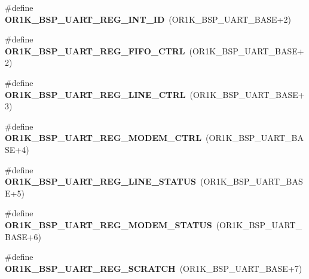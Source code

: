 \begin{DoxyCompactItemize}
\item 
\mbox{\label{group__generic__or1k__reg_gacf46f93e3c2435365743911ff3aba606}} 
\#define {\bfseries O\+R1\+K\+\_\+\+B\+S\+P\+\_\+\+U\+A\+R\+T\+\_\+\+R\+E\+G\+\_\+\+I\+N\+T\+\_\+\+ID}~(O\+R1\+K\+\_\+\+B\+S\+P\+\_\+\+U\+A\+R\+T\+\_\+\+B\+A\+SE+2)
\item 
\mbox{\label{group__generic__or1k__reg_ga3008c4067916d1ef50eec2a9dee160d1}} 
\#define {\bfseries O\+R1\+K\+\_\+\+B\+S\+P\+\_\+\+U\+A\+R\+T\+\_\+\+R\+E\+G\+\_\+\+F\+I\+F\+O\+\_\+\+C\+T\+RL}~(O\+R1\+K\+\_\+\+B\+S\+P\+\_\+\+U\+A\+R\+T\+\_\+\+B\+A\+SE+2)
\item 
\mbox{\label{group__generic__or1k__reg_ga7946b4bb4752f46aa2752c8ff9e10c15}} 
\#define {\bfseries O\+R1\+K\+\_\+\+B\+S\+P\+\_\+\+U\+A\+R\+T\+\_\+\+R\+E\+G\+\_\+\+L\+I\+N\+E\+\_\+\+C\+T\+RL}~(O\+R1\+K\+\_\+\+B\+S\+P\+\_\+\+U\+A\+R\+T\+\_\+\+B\+A\+SE+3)
\item 
\mbox{\label{group__generic__or1k__reg_gaa3cf96f25c33d667aa05353de13ebadb}} 
\#define {\bfseries O\+R1\+K\+\_\+\+B\+S\+P\+\_\+\+U\+A\+R\+T\+\_\+\+R\+E\+G\+\_\+\+M\+O\+D\+E\+M\+\_\+\+C\+T\+RL}~(O\+R1\+K\+\_\+\+B\+S\+P\+\_\+\+U\+A\+R\+T\+\_\+\+B\+A\+SE+4)
\item 
\mbox{\label{group__generic__or1k__reg_ga4661bde9d0f27736ab8c0035c0996e3e}} 
\#define {\bfseries O\+R1\+K\+\_\+\+B\+S\+P\+\_\+\+U\+A\+R\+T\+\_\+\+R\+E\+G\+\_\+\+L\+I\+N\+E\+\_\+\+S\+T\+A\+T\+US}~(O\+R1\+K\+\_\+\+B\+S\+P\+\_\+\+U\+A\+R\+T\+\_\+\+B\+A\+SE+5)
\item 
\mbox{\label{group__generic__or1k__reg_gac5f7eca6cf7bd77a6f2a25c1b241b3be}} 
\#define {\bfseries O\+R1\+K\+\_\+\+B\+S\+P\+\_\+\+U\+A\+R\+T\+\_\+\+R\+E\+G\+\_\+\+M\+O\+D\+E\+M\+\_\+\+S\+T\+A\+T\+US}~(O\+R1\+K\+\_\+\+B\+S\+P\+\_\+\+U\+A\+R\+T\+\_\+\+B\+A\+SE+6)
\item 
\mbox{\label{group__generic__or1k__reg_ga02fcc9690b966866f219101dff33fabd}} 
\#define {\bfseries O\+R1\+K\+\_\+\+B\+S\+P\+\_\+\+U\+A\+R\+T\+\_\+\+R\+E\+G\+\_\+\+S\+C\+R\+A\+T\+CH}~(O\+R1\+K\+\_\+\+B\+S\+P\+\_\+\+U\+A\+R\+T\+\_\+\+B\+A\+SE+7)

\end{DoxyCompactItemize}
